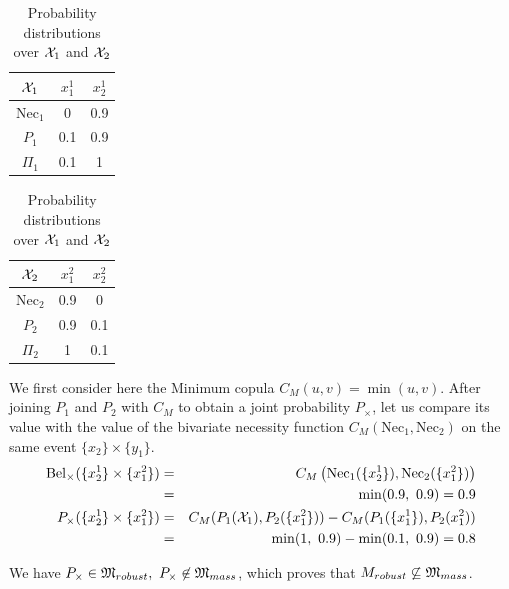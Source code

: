 \begin{example}
    \begin{table}[!ht]
        \centering
        \begin{tabular}{|c|c|c|}
            \hline
            ${\mathcal{X}}_1$ & $x^1_1$ & $x^1_2$\\
            \hline\hline
            $\mathrm{Nec}_1$ & 0 & 0.9\\
            \hline
            $P_1$  & 0.1 & 0.9\\
            \hline
            $\Pi_1$ & 0.1 & 1\\
            \hline
        \end{tabular}
        \quad
        \begin{tabular}{|c|c|c|}
            \hline
            ${\mathcal{X}}_2$ & $x^2_1$ & $x^2_2$\\
            \hline\hline
            $\mathrm{Nec}_2$ & 0.9 & 0\\
            \hline
            $P_2$  & 0.9 & 0.1\\
            \hline
            $\Pi_2$ & 1 & 0.1\\
            \hline
        \end{tabular}
        \caption{Probability distributions over ${\mathcal{X}}_1$ and ${\mathcal{X}}_2$}
        \label{tab:proba_distrib_1}
    \end{table}
    
    We first consider here the Minimum copula $C_M(u,v)=\min(u,v)$. After joining $P_1$ and $P_2$ with $C_M$ to obtain a joint probability $P_\times$, let us compare its value with the value of the bivariate necessity function $C_M(\mathrm{Nec}_1, \mathrm{Nec}_2)$ on the same event $\{x_2\}\times\{y_1\}$.
    \begin{eqnarray*}
        \mathrm{Bel}_\times(\{x^1_2\}\times\{x^2_1\}) &=& C_M\left(\mathrm{Nec}_1(\{x^1_2\}), \mathrm{Nec}_2(\{x^2_1\})\right)\\
        &=& \min(0.9,~0.9) = 0.9\\
        P_\times(\{x^1_2\}\times\{x^2_1\}) &=& C_M(P_1({\mathcal{X}}_1), P_2(\{x^2_1\})) - C_M(P_1(\{x^1_1\}),P_2(x^2_1))\\
        &=& \min(1,~0.9) - \min(0.1,~0.9) = 0.8
    \end{eqnarray*}
    
    We have $P_\times\in{\mathfrak{M}}_{robust}, ~P_\times\not\in{\mathfrak{M}}_{mass}$, which proves that ${M}_{robust}\not\subseteq{\mathfrak{M}}_{mass}$.
    

\end{example}
